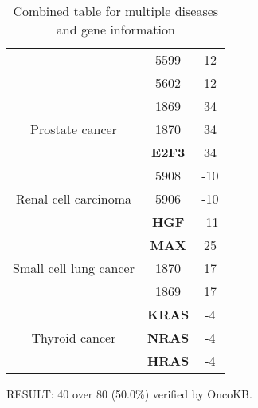 \begin{table}[h!]
\begin{tabular}{|c|c|c|}
    \cline{2-3} & 5599 & 12 \\
    
    \cline{2-3} & 5602 & 12 \\
    \hline\multirow{3}{*}{Prostate cancer} & 1869 & 34 \\ 

    \cline{2-3} & 1870 & 34 \\
    
    \cline{2-3} & \textbf{E2F3} & 34 \\
    \hline\multirow{3}{*}{Renal cell carcinoma} & 5908 & -10 \\ 

    \cline{2-3} & 5906 & -10 \\
    
    \cline{2-3} & \textbf{HGF} & -11 \\
    \hline\multirow{3}{*}{Small cell lung cancer} & \textbf{MAX} & 25 \\ 

    \cline{2-3} & 1870 & 17 \\
    
    \cline{2-3} & 1869 & 17 \\
    \hline\multirow{3}{*}{Thyroid cancer} & \textbf{KRAS} & -4 \\ 

    \cline{2-3} & \textbf{NRAS} & -4 \\
    
    \cline{2-3} & \textbf{HRAS} & -4 \\
    \hline
    \end{tabular}
    \caption{Combined table for multiple diseases and gene information}
    \label{tab:combined}
\end{table}
        RESULT: 40 over 80 (50.0\%) verified by OncoKB.